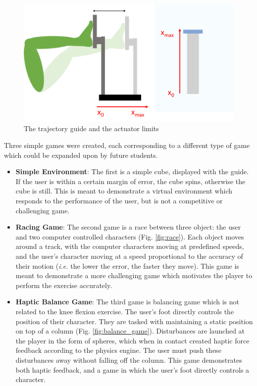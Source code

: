 \documentclass[12pt]{report}
\begin{document}
	\begin{figure}[h] 
		\centering
		\includegraphics[width=\linewidth]{axis_leg}
		\caption{The trajectory guide and the actuator limits}
		\label{fig:axis_leg}
	\end{figure} 
	

	
	Three simple games were created, each corresponding to a different type of game which could be expanded upon by future students.
	

\begin{itemize}

\item \textbf{Simple Environment}: The first is a simple cube, displayed with the guide. If the user is within a certain margin of error, the cube spins, otherwise the cube is still. This is meant to demonstrate a virtual environment which responds to the performance of the user, but is not a competitive or challenging game. 

\item \textbf{Racing Game}: The second game is a race between three object: the user and two computer controlled characters (Fig. \ref{fig:race}). Each object moves around a track, with the computer characters moving at predefined speeds, and the user's character moving at a speed proportional to the accuracy of their motion (\textit{i.e.} the lower the error, the faster they move). This game is meant to demonstrate a more challenging game which motivates the player to perform the exercise accurately. 

\item \textbf{Haptic Balance Game}: The third game is balancing game which is not related to the knee flexion exercise. The user's foot directly controls the position of their character. They are tasked with maintaining a static position on top of a column (Fig. \ref{fig:balance_game}). Disturbances are launched at the player in the form of spheres, which when in contact created haptic force feedback according to the physics engine. The user must push these disturbances away without falling off the column. This game demonstrates both haptic feedback, and a game in which the user's foot directly controls a character. 


\end{itemize}	
	
\end{document}
